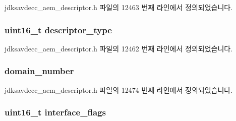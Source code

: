 jdksavdecc\+\_\+aem\+\_\+descriptor.\+h 파일의 12463 번째 라인에서 정의되었습니다.

\subsubsection[{\texorpdfstring{descriptor\+\_\+type}{descriptor_type}}]{\setlength{\rightskip}{0pt plus 5cm}uint16\+\_\+t descriptor\+\_\+type}\hypertarget{structjdksavdecc__descriptor__avb__interface_ab7c32b6c7131c13d4ea3b7ee2f09b78d}{}\label{structjdksavdecc__descriptor__avb__interface_ab7c32b6c7131c13d4ea3b7ee2f09b78d}


jdksavdecc\+\_\+aem\+\_\+descriptor.\+h 파일의 12462 번째 라인에서 정의되었습니다.

\subsubsection[{\texorpdfstring{domain\+\_\+number}{domain_number}}]{ domain\+\_\+number}\hypertarget{structjdksavdecc__descriptor__avb__interface_a96702548f5b9222af26319c695764b29}{}\label{structjdksavdecc__descriptor__avb__interface_a96702548f5b9222af26319c695764b29}


jdksavdecc\+\_\+aem\+\_\+descriptor.\+h 파일의 12474 번째 라인에서 정의되었습니다.

\subsubsection[{\texorpdfstring{interface\+\_\+flags}{interface_flags}}]{\setlength{\rightskip}{0pt plus 5cm}uint16\+\_\+t interface\+\_\+flags}\hypertarget{structjdksavdecc__descriptor__avb__interface_adc7cb8c2df340891c22794bfac689e7d}{}\label{structjdksavdecc__descriptor__avb__interface_adc7cb8c2df340891c22794bfac689e7d}


